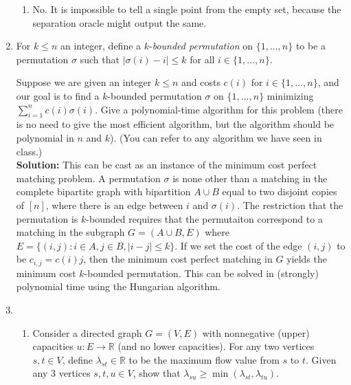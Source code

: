 \documentclass[12pt]{article}
\begin{document}
\begin{enumerate}
\begin{enumerate}
\item No. It is impossible to tell a single point from the empty set, because the separation oracle might output the same.
\end{enumerate}

\newpage
\item

For $k \le n$ an integer, define a $k$-\emph{bounded permutation} on $\{1, ..., n\}$ to be a permutation $\sigma$ such that $|\sigma(i) - i| \le k$ for all $i \in \{1, ..., n\}$.

Suppose we are given an integer $k \le n$ and costs $c(i)$ for $i\in\{1,...,n\}$, and our goal is to find a $k$-bounded permutation $\sigma$ on $\{1, ..., n\}$ minimizing $\sum_{i=1}^n c(i) \sigma(i)$. Give a polynomial-time algorithm for this problem (there is no need to give the most efficient algorithm, but the algorithm should be polynomial in $n$ and $k$). (You can refer to any algorithm we have seen in class.)\\

\textbf{Solution: } This can be cast as an instance of the minimum cost perfect matching problem. A permutation $\sigma$ is none other than a matching in the complete bipartite graph with bipartition $A \cup B$ equal to two disjoint copies of $[n]$, where there is an edge between $i$ and $\sigma(i)$. The restriction that the permutation is $k$-bounded requires that the permutaiton correspond to a matching in the subgraph $G = (A \cup B, E)$ where $E = \{(i,j): i \in A, j \in B, |i - j| \leq k\}$. If we set the cost of the edge $(i,j)$ to be $c_{i,j} = c(i) j$, then the minimum cost perfect matching in $G$ yields the minimum cost $k$-bounded permutation. This can be solved in (strongly) polynomial time using the Hungarian algorithm.



\newpage

\item
\begin{enumerate}
	\item
Consider a directed graph $G=(V,E)$ with nonnegative (upper) capacities $u: E \rightarrow {\mathbb R}$ (and no lower capacities). For any two vertices $s, t\in V$, define $\lambda_{st}\in {\mathbb R}$ to be the maximum flow value from $s$ to $t$. Given any 3 vertices $s, t, u\in V$, show that $\lambda_{su} \geq \min(\lambda_{st},\lambda_{tu})$.


\end{enumerate}
\end{enumerate}
\end{document}
